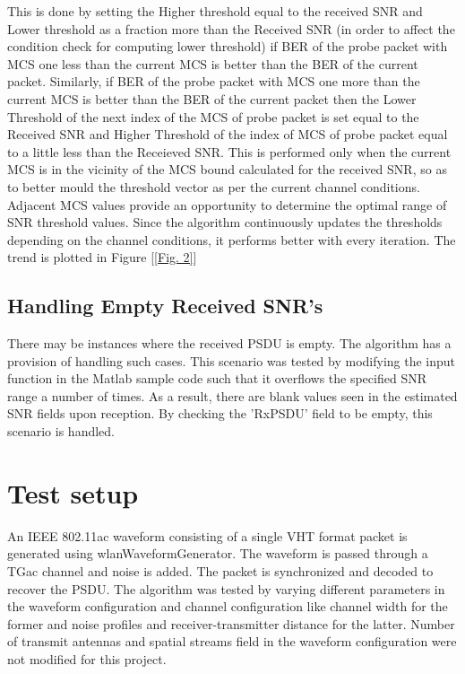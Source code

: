 \documentclass[a4paper, 10pt, conference]{ieeeconf}
\begin{document}
This is done by setting the Higher threshold equal to the received SNR and Lower threshold as a fraction more than the Received SNR (in order to affect the condition check for computing lower threshold) if BER of the probe packet with MCS one less than the current MCS is better than the BER of the current packet. Similarly, if BER of the probe packet with MCS one more than the current MCS is better than the BER of the current packet then the Lower Threshold of the next index of the MCS of probe packet is set equal to the Received SNR and Higher Threshold of the index of MCS of probe packet equal to a little less than the Receieved SNR.
This is performed only when the current MCS is in the vicinity of the MCS bound calculated for the received SNR, so as to better mould the threshold vector as per the current channel conditions. Adjacent MCS values provide an opportunity to determine the optimal range of SNR threshold values. Since the algorithm continuously updates the thresholds depending on the channel conditions, it performs better with every iteration. The trend is plotted in Figure [\ref{Fig. 2}]

\subsection{Handling Empty Received SNR's}

There may be instances where the received PSDU is empty. The algorithm has a provision of handling such cases. This scenario was tested by modifying the input function in the Matlab sample code such that it overflows the specified SNR range a number of times. As a result, there are blank values seen in the estimated SNR fields upon reception. By checking the 'RxPSDU' field to be empty, this scenario is handled.

\section{Test setup}

An IEEE 802.11ac waveform consisting of a single VHT format packet is generated using wlanWaveformGenerator. The waveform is passed through a TGac channel and noise is added. The packet is synchronized and decoded to recover the PSDU. The algorithm was tested by varying different parameters in the waveform configuration and channel configuration like channel width for the former and noise profiles and receiver-transmitter distance for the latter.
Number of transmit antennas and spatial streams field in the waveform configuration were not modified for this project. 
\end{document}
